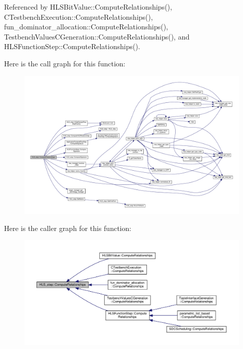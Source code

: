 Referenced by H\+L\+S\+Bit\+Value\+::\+Compute\+Relationships(), C\+Testbench\+Execution\+::\+Compute\+Relationships(), fun\+\_\+dominator\+\_\+allocation\+::\+Compute\+Relationships(), Testbench\+Values\+C\+Generation\+::\+Compute\+Relationships(), and H\+L\+S\+Function\+Step\+::\+Compute\+Relationships().

Here is the call graph for this function\+:
\nopagebreak
\begin{figure}[H]
\begin{center}
\leavevmode
\includegraphics[width=350pt]{da/d27/classHLS__step_ad5c58777d9b466fb3eee185f6d3ac993_cgraph}
\end{center}
\end{figure}
Here is the caller graph for this function\+:
\nopagebreak
\begin{figure}[H]
\begin{center}
\leavevmode
\includegraphics[width=350pt]{da/d27/classHLS__step_ad5c58777d9b466fb3eee185f6d3ac993_icgraph}
\end{center}
\end{figure}
\mbox{\label{classHLS__step_ad83e627f771dd1b2315f568321475316}} 
